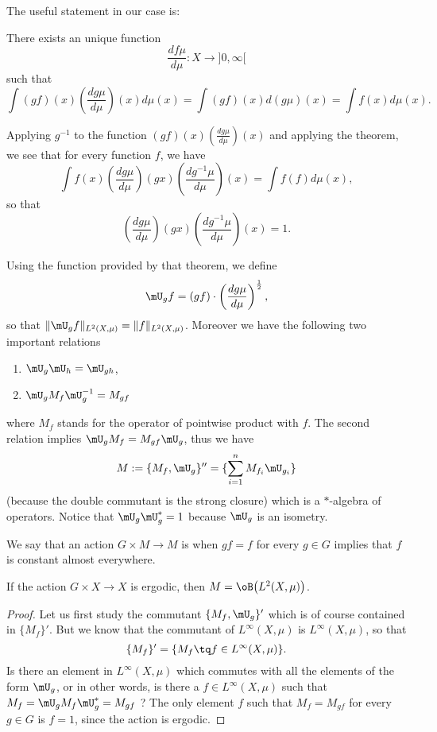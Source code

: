 The useful statement in our case is:
\begin{proposition}
There exists an unique function 
\[ 
	\frac{ d f\mu }{ d \mu }\colon X\to ]0,\infty[
\]
such that
\begin{equation}	\label{EqDefRadonNiko}
		\int (gf)(x)\left( \frac{ d g\mu }{ d \mu } \right)(x)d\mu(x)=\int (gf)(x)d(g\mu)(x)=\int f(x)d\mu(x).
\end{equation}
\end{proposition}
Applying $g^{-1}$ to the function $(gf)(x)\left( \frac{ d g\mu }{ d \mu } \right)(x)$ and applying the theorem, we see that for every function $f$, we have
\[ 
  \int f(x)\left( \frac{ d g\mu }{ d \mu } \right)(gx)\left( \frac{ d g^{-1}\mu }{ d \mu } \right)(x)=\int f(f)d\mu(x),
\]
so that
\begin{equation}
  \left( \frac{ d g\mu }{ d \mu } \right)(gx)\left( \frac{ d g^{-1}\mu }{ d \mu } \right)(x)=1.
\end{equation}

Using the function provided by that theorem, we define
\begin{equation}
\mU_gf=(gf)\cdot\left( \frac{ d g\mu }{ d \mu } \right)^{\frac{ 1 }{2}},
\end{equation}
so that $\| \mU_gf \|_{ L^2(X,\mu)}=\| f \|_{ L^2(X,\mu)}$. Moreover we have the following two important relations
\begin{enumerate}
\item $\mU_g\mU_h=\mU_{gh}$,
\item $\mU_g M_f \mU_g^{-1}=M_{gf}$
\end{enumerate}
where $M_f$ stands for the operator of pointwise product with $f$. The second relation implies $\mU_g M_f=M_{gf}\mU_g$, thus we have
\begin{equation}
M:=\{ M_f,\mU_g \}''=\{ \sum_{i=1}^n M_{f_i}\mU_{g_i} \}
\end{equation}
(because the double commutant is the strong closure) which is a $*$-algebra of operators. Notice that $\mU_g\mU_g^*=1$ because $\mU_g$ is an isometry.

We say that an action $G\times M\to M$ is  when $gf=f$ for every $g\in G$ implies that $f$ is constant almost everywhere.

\begin{lemma}		\label{LemergoBLCmu}
If the action $G\times X\to X$ is ergodic, then $M=\oB\big(  L^2(X,\mu) \big)$.
\end{lemma}

\begin{proof}
Let us first study the commutant $\{ M_f,\mU_g \}'$ which is of course contained in $\{ M_f \}'$. But we know that the commutant of $ L^{\infty}(X,\mu)$ is $ L^{\infty}(X,\mu)$, so that
\[ 
  \{ M_f \}'=\{ M_f\tq f\in L^{\infty}(X,\mu) \}.
\]
Is there an element in $ L^{\infty}(X,\mu)$ which commutes with all the elements of the form $\mU_g$, or in other words, is there a $f\in  L^{\infty}(X,\mu)$ such that $M_f=\mU_g M_f\mU_g^*=M_{gf}$ ? The only element $f$ such that $M_f=M_{gf}$ for every $g\in G$ is $f=1$, since the action is ergodic.
\end{proof}

